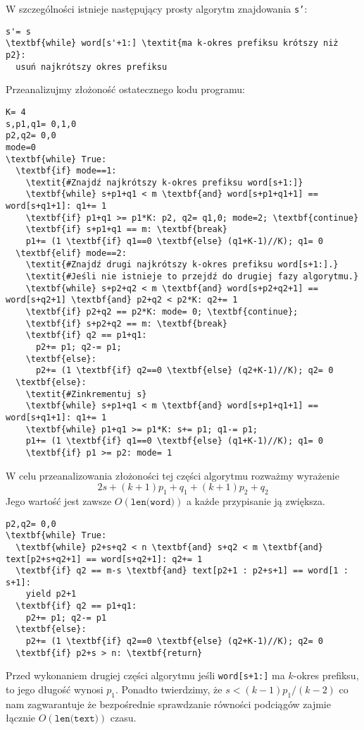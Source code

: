 W szczególności istnieje następujący prosty algorytm znajdowania \texttt{s'}:
\begin{verbatim}
s'= s
\textbf{while} word[s'+1:] \textit{ma k-okres prefiksu krótszy niż p2}:
  usuń najkrótszy okres prefiksu
\end{verbatim}
Przeanalizujmy złożoność ostatecznego kodu programu:
\begin{verbatim}
K= 4
s,p1,q1= 0,1,0
p2,q2= 0,0
mode=0
\textbf{while} True:
  \textbf{if} mode==1:
    \textit{#Znajdź najkrótszy k-okres prefiksu word[s+1:]}
    \textbf{while} s+p1+q1 < m \textbf{and} word[s+p1+q1+1] == word[s+q1+1]: q1+= 1
    \textbf{if} p1+q1 >= p1*K: p2, q2= q1,0; mode=2; \textbf{continue}
    \textbf{if} s+p1+q1 == m: \textbf{break}
    p1+= (1 \textbf{if} q1==0 \textbf{else} (q1+K-1)//K); q1= 0
  \textbf{elif} mode==2:
    \textit{#Znajdź drugi najkrótszy k-okres prefiksu word[s+1:].}
    \textit{#Jeśli nie istnieje to przejdź do drugiej fazy algorytmu.}
    \textbf{while} s+p2+q2 < m \textbf{and} word[s+p2+q2+1] == word[s+q2+1] \textbf{and} p2+q2 < p2*K: q2+= 1
    \textbf{if} p2+q2 == p2*K: mode= 0; \textbf{continue};
    \textbf{if} s+p2+q2 == m: \textbf{break}
    \textbf{if} q2 == p1+q1:
      p2+= p1; q2-= p1;
    \textbf{else}:
      p2+= (1 \textbf{if} q2==0 \textbf{else} (q2+K-1)//K); q2= 0
  \textbf{else}:
    \textit{#Zinkrementuj s}
    \textbf{while} s+p1+q1 < m \textbf{and} word[s+p1+q1+1] == word[s+q1+1]: q1+= 1
    \textbf{while} p1+q1 >= p1*K: s+= p1; q1-= p1;
    p1+= (1 \textbf{if} q1==0 \textbf{else} (q1+K-1)//K); q1= 0
    \textbf{if} p1 >= p2: mode= 1
\end{verbatim}
W celu przeanalizowania złożoności tej części algorytmu rozważmy wyrażenie
\[
2s+{\left(k+1\right)}p_1+q_1+{\left(k+1\right)}p_2+q_2
\]
Jego wartość jest zawsze $O{\left(\texttt{len(word)}\right)}$ a każde przypisanie ją zwiększa.
\begin{verbatim}
p2,q2= 0,0
\textbf{while} True:
  \textbf{while} p2+s+q2 < n \textbf{and} s+q2 < m \textbf{and} text[p2+s+q2+1] == word[s+q2+1]: q2+= 1
  \textbf{if} q2 == m-s \textbf{and} text[p2+1 : p2+s+1] == word[1 : s+1]:
    yield p2+1
  \textbf{if} q2 == p1+q1:
    p2+= p1; q2-= p1
  \textbf{else}:
    p2+= (1 \textbf{if} q2==0 \textbf{else} (q2+K-1)//K); q2= 0
  \textbf{if} p2+s > n: \textbf{return}
\end{verbatim}
Przed wykonaniem drugiej części algorytmu jeśli \texttt{word[s+1:]} ma \(k\)-okres prefiksu, to jego długość wynosi \(p_1\).
Ponadto twierdzimy, że \(s<{\left(k-1\right)}p_1/{\left(k-2\right)}\) co nam zagwarantuje że bezpośrednie sprawdzanie równości podciągów zajmie łącznie $O{\left(\texttt{len(text)}\right)}$ czasu.

